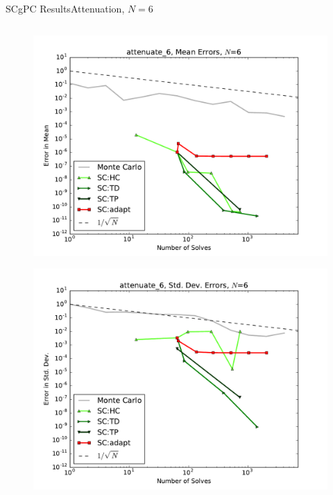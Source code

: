 \documentclass{beamer}
\begin{document}
\begin{frame}{SCgPC Results}{Attenuation, $N=6$}
\begin{columns}
\begin{column}{0.5\textwidth}
\begin{figure}[h!]
          \includegraphics[width=0.8\linewidth]{anlmodels/attenuate_6_mean_errs_nohdmr}
        \end{figure}
        \vspace{-20pt}
        \begin{figure}[h!]
          \centering
          \includegraphics[width=0.8\linewidth]{anlmodels/attenuate_6_variance_errs_nohdmr}
        \end{figure}
   \end{column}
 \end{columns}
\end{frame}
\end{document}

